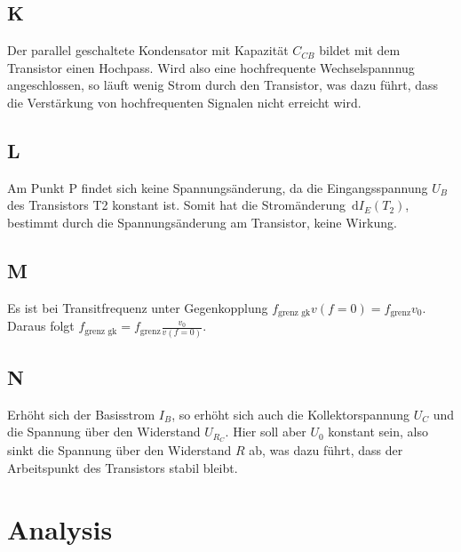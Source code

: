 \documentclass[a4paper,10pt]{article}
\newcommand{\td}{\,\text{d}}
\numberwithin{equation}{section}
\begin{document}
\begin{multicols}{2}
	\subsection{K}
	Der parallel geschaltete Kondensator mit Kapazität $C_{CB}$ bildet mit dem Transistor einen Hochpass.
Wird also eine hochfrequente Wechselspannnug angeschlossen, so läuft wenig Strom durch den Transistor, was dazu führt, dass die Verstärkung von hochfrequenten Signalen nicht erreicht wird.

	\subsection{L}
	Am Punkt P findet sich keine Spannungsänderung, da die Eingangsspannung $U_B$ des Transistors T2 konstant ist.
	Somit hat die Stromänderung $\td I_E\left(T_2\right)$, bestimmt durch die Spannungsänderung am Transistor, keine Wirkung.

	\subsection{M}
	Es ist bei Transitfrequenz unter Gegenkopplung $f_\text{grenz gk}v\left(f=0\right)=f_\text{grenz}v_0$.
	Daraus folgt $f_\text{grenz gk}=f_\text{grenz}\tfrac{v_0}{v\left(f=0\right)}$.

	\subsection{N}
	Erhöht sich der Basisstrom $I_B$, so erhöht sich auch die Kollektorspannung $U_C$ und die Spannung über den Widerstand $U_{R_C}$.
	Hier soll aber $U_0$ konstant sein, also sinkt die Spannung über den Widerstand $R$ ab, was dazu führt, dass der Arbeitspunkt des Transistors stabil bleibt.

	\clearpage
	\section{Analysis}

\end{multicols}
\end{document}
